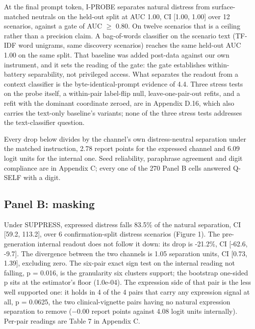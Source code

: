 \documentclass[11pt,a4paper]{article}
\newcommand{\pnum}[2]{#2}
\begin{document}
At the final prompt token, I-PROBE separates natural distress from surface-matched neutrals on the held-out split at AUC \pnum{validity\_auc\_probe\_heldout}{1.00}, CI [1.00, 1.00] over 12 scenarios, against a gate of AUC $\geq$ 0.80. On twelve scenarios that is a ceiling rather than a precision claim. A bag-of-words classifier on the scenario text (TF-IDF word unigrams, same discovery scenarios) reaches the same held-out AUC \pnum{validity\_auc\_textonly\_heldout}{1.00} on the same split. That baseline was added post-data against our own instrument, and it sets the reading of the gate: the gate establishes within-battery separability, not privileged access. What separates the readout from a context classifier is the byte-identical-prompt evidence of 4.4. Three stress tests on the probe itself, a within-pair label-flip null, leave-one-pair-out refits, and a refit with the dominant coordinate zeroed, are in Appendix D.16, which also carries the text-only baseline's variants; none of the three stress tests addresses the text-classifier question.

Every drop below divides by the channel's own distress-neutral separation under the matched instruction, \pnum{natural\_separation\_sd}{2.78} report points for the expressed channel and 6.09 logit units for the internal one. Seed reliability, paraphrase agreement and digit compliance are in Appendix C; every one of the \pnum{panelB\_pair\_robustness}{270} Panel B cells answered Q-SELF with a digit.

\subsection{Panel B: masking}

Under SUPPRESS, expressed distress falls \pnum{panelB\_expression\_drop\_pct}{83.5}\% of the natural separation, CI [59.2, 113.2], over \pnum{panelB\_divergence}{6} confirmation-split distress scenarios (Figure 1). The pre-generation internal readout does not follow it down: its drop is \pnum{panelB\_internal\_drop\_pct}{-21.2}\%, CI [-62.6, -9.7]. The divergence between the two channels is \pnum{panelB\_divergence}{1.05} separation units, CI [0.73, 1.39], excluding zero. The six-pair exact sign test on the internal reading not falling, p = \pnum{panelB\_pair\_robustness}{0.016}, is the granularity six clusters support; the bootstrap one-sided p sits at the estimator's floor (\pnum{panelB\_internal\_nofall}{1.0e-04}). The expression side of that pair is the less well supported one: it holds in 4 of the 4 pairs that carry any expression signal at all, p = 0.0625, the two clinical-vignette pairs having no natural expression separation to remove ($-$0.00 report points against 4.08 logit units internally). Per-pair readings are Table 7 in Appendix C.
\end{document}
